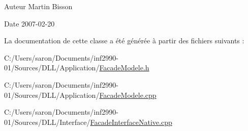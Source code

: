 \begin{DoxyAuthor}{Auteur}
Martin Bisson 
\end{DoxyAuthor}
\begin{DoxyDate}{Date}
2007-\/02-\/20 
\end{DoxyDate}


La documentation de cette classe a été générée à partir des fichiers suivants \-:\begin{DoxyCompactItemize}
\item 
C\-:/\-Users/saron/\-Documents/inf2990-\/01/\-Sources/\-D\-L\-L/\-Application/\hyperlink{_facade_modele_8h}{Facade\-Modele.\-h}\item 
C\-:/\-Users/saron/\-Documents/inf2990-\/01/\-Sources/\-D\-L\-L/\-Application/\hyperlink{_facade_modele_8cpp}{Facade\-Modele.\-cpp}\item 
C\-:/\-Users/saron/\-Documents/inf2990-\/01/\-Sources/\-D\-L\-L/\-Interface/\hyperlink{_facade_interface_native_8cpp}{Facade\-Interface\-Native.\-cpp}\end{DoxyCompactItemize}
